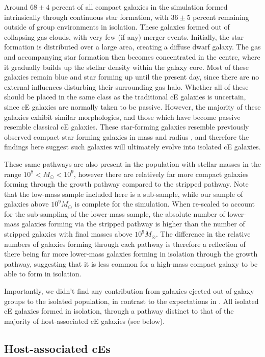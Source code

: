 \documentclass[a4paper,fleqn,usenatbib]{mnras}
\begin{document}
Around $68\pm4$ percent of all compact galaxies in the simulation formed intrinsically through continuous star formation, with $36\pm5$ percent remaining outside of group environments in isolation. These galaxies formed out of collapsing gas clouds, with very few (if any) merger events. Initially, the star formation is distributed over a large area, creating a diffuse dwarf galaxy. The gas and accompanying star formation then becomes concentrated in the centre, where it gradually builds up the stellar density within the galaxy core. Most of these galaxies remain blue and star forming up until the present day, since there are no external influences disturbing their surrounding gas halo. Whether all of these should be placed in the same class as the traditional cE galaxies is uncertain, since cE galaxies are normally taken to be passive. However, the majority of these galaxies exhibit similar morphologies, and those which have become passive resemble classical cE galaxies. These star-forming galaxies resemble previously observed compact star forming galaxies in mass and radius \citep{2015ApJ...807..139F}, and therefore the findings here suggest such galaxies will ultimately evolve into isolated cE galaxies. 

These same pathways are also present in the population with stellar masses in the range $10^{8} < M_{\odot} < 10^{9}$, however there are relatively far more compact galaxies forming through the growth pathway compared to the stripped pathway. Note that the low-mass sample included here is a sub-sample, while our sample of galaxies above $10^{9} M_{\odot}$ is complete for the simulation. When re-scaled to account for the sub-sampling of the lower-mass sample, the absolute number of lower-mass galaxies forming via the stripped pathway is higher than the number of stripped galaxies with final masses above $10^{9} M_{\odot}$. The difference in the relative numbers of galaxies forming through each pathway is therefore a reflection of there being far more lower-mass galaxies forming in isolation through the growth pathway, suggesting that it is less common for a high-mass compact galaxy to be able to form in isolation.


Importantly, we didn't find any contribution from galaxies ejected out of galaxy groups to the isolated population, in contrast to the expectations in \citet{2015Sci...348..418C}. All isolated cE galaxies formed in isolation, through a pathway distinct to that of the majority of host-associated cE galaxies (see below). 

\subsection{Host-associated cEs}
\end{document}
